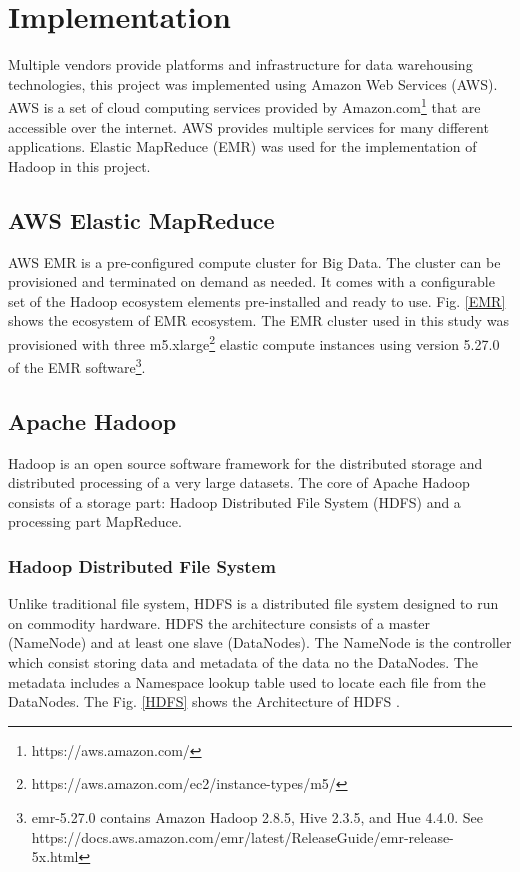 \documentclass[journal]{IEEEtran}
\begin{document}
\section{Implementation}

Multiple vendors provide platforms and infrastructure for data warehousing technologies, 
 this project was implemented using Amazon Web Services (AWS).
AWS is a set of cloud computing services provided by Amazon.com\footnote{https://aws.amazon.com/}
 that are accessible over the internet.
AWS provides multiple services for many different applications. 
Elastic MapReduce (EMR) was used for the implementation of Hadoop in this project.

\subsection{AWS Elastic MapReduce}

AWS EMR is a pre-configured compute cluster for Big Data.
The cluster can be provisioned and terminated on demand as needed.
It comes with a configurable set of the Hadoop ecosystem elements pre-installed and ready to use.
Fig. \ref{EMR} shows the ecosystem of EMR ecosystem.
The EMR cluster used in this study was provisioned with three
 m5.xlarge\footnote{https://aws.amazon.com/ec2/instance-types/m5/}
 elastic compute instances using version 5.27.0 of the EMR 
 software\footnote{emr-5.27.0 contains Amazon Hadoop 2.8.5, Hive 2.3.5, and Hue 4.4.0. See https://docs.aws.amazon.com/emr/latest/ReleaseGuide/emr-release-5x.html}.

\subsection{Apache Hadoop}

Hadoop is an open source software framework for the distributed storage and
 distributed processing of a very large datasets. 
The core of Apache Hadoop consists of a storage part: Hadoop Distributed File System
 (HDFS) and a processing part MapReduce.

\subsubsection{Hadoop Distributed File System}

Unlike traditional file system, HDFS is a distributed file system designed to run on commodity hardware. 
HDFS the architecture consists of a master (NameNode) and at least one slave (DataNodes)\cite{HDFSarchitecture}.
The NameNode is the controller which consist storing data and metadata of the data no the DataNodes.
 The metadata includes a Namespace lookup table used to locate each file from the DataNodes. 
The Fig. \ref{HDFS} shows the Architecture of HDFS \cite{HDFS}.
\end{document}
